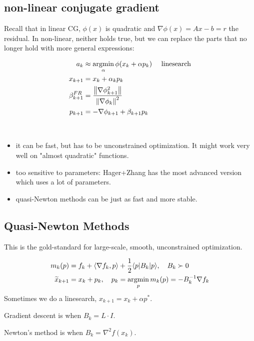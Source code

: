 \documentclass[class=article,crop=false]{standalone}
\begin{document}
\subsection{non-linear conjugate gradient}
Recall that in linear CG, $ \phi(x)$ is quadratic and $ \nabla \phi(x) = Ax-b = r$ the residual. In non-linear, neither holds true, but we can replace the parts that no longer hold with more general expressions:
\begin{thm}
\begin{align*}
	a_k &\approx \operatorname*{argmin}_{\alpha} \phi(x_k+ \alpha p_k) &&\text{ linesearch} \\
	x_{k+1} &= x_k + \alpha_k p_k\\
	\beta_{k+1}^{FR} &= \frac{{\left\lVert{ \nabla \phi_{k+1}^2}\right\rVert} }{{\left\lVert{ \nabla \phi_k}\right\rVert}^2  } \\
	p_{k+1} &= -\nabla \phi_{k+1} + \beta_{k+1} p_k
\end{align*}
\end{thm}
\begin{remark}
	~\begin{itemize}
		\item it can be fast, but has to be unconstrained optimization. It might work very well on "almost quadratic" functions.
		\item too sensitive to parameters: Hager+Zhang has the most advanced version which uses a lot of parameters.
		\item quasi-Newton methods can be just as fast and more stable.
	\end{itemize}
\end{remark}
\newpage
\subsection{Quasi-Newton Methods}
\begin{remark}
This is the gold-standard for large-scale, smooth, unconstrained optimization.
\end{remark}

\begin{defn}
\begin{align*}
	m_k(p) &= f_k + \langle \nabla f_k,p \rangle + \frac{1}{2} \langle p|B_k|p \rangle, \quad B_k \succ 0 \\
	\widetilde{ x}_{k+1} &= x_k +p_k , \quad p_k = \operatorname*{argmin}_p m_k(p) = - B_k^{-1} \nabla f_k
\end{align*}
Sometimes we do a linesearch, $ x_{k+1} = x_k + \alpha p^* $.
\end{defn}
\begin{eg}
Gradient descent is when $ B_k = L \cdot I.$
\end{eg}
\begin{eg}
	Newton's method is when $ B_k = \nabla^2 f(x_k)$.
\end{eg}
\end{document}
